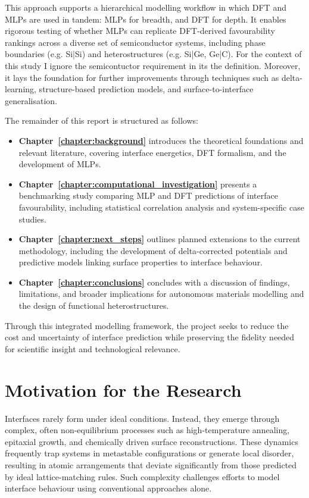 This approach supports a hierarchical modelling workflow in which DFT and MLPs are used in tandem: MLPs for breadth, and DFT for depth. It enables rigorous testing of whether MLPs can replicate DFT-derived favourability rankings across a diverse set of semiconductor systems, including phase boundaries (e.g. Si|Si) and heterostructures (e.g. Si|Ge, Ge|C). For the context of this study I ignore the semicontuctor requirement in its the definition. Moreover, it lays the foundation for further improvements through techniques such as delta-learning, structure-based prediction models, and surface-to-interface generalisation.

The remainder of this report is structured as follows: 

\begin{itemize}
    \item \textbf{Chapter~\ref{chapter:background}} introduces the theoretical foundations and relevant literature, covering interface energetics, DFT formalism, and the development of MLPs.
    \item \textbf{Chapter~\ref{chapter:computational_investigation}} presents a benchmarking study comparing MLP and DFT predictions of interface favourability, including statistical correlation analysis and system-specific case studies.
    \item \textbf{Chapter~\ref{chapter:next_steps}} outlines planned extensions to the current methodology, including the development of delta-corrected potentials and predictive models linking surface properties to interface behaviour.
    \item \textbf{Chapter~\ref{chapter:conclusions}} concludes with a discussion of findings, limitations, and broader implications for autonomous materials modelling and the design of functional heterostructures.
\end{itemize}

Through this integrated modelling framework, the project seeks to reduce the cost and uncertainty of interface prediction while preserving the fidelity needed for scientific insight and technological relevance.

\section{Motivation for the Research} \label{section:motivation} 

Interfaces rarely form under ideal conditions. Instead, they emerge through complex, often non-equilibrium processes such as high-temperature annealing, epitaxial growth, and chemically driven surface reconstructions. These dynamics frequently trap systems in metastable configurations or generate local disorder, resulting in atomic arrangements that deviate significantly from those predicted by ideal lattice-matching rules. Such complexity challenges efforts to model interface behaviour using conventional approaches alone.

